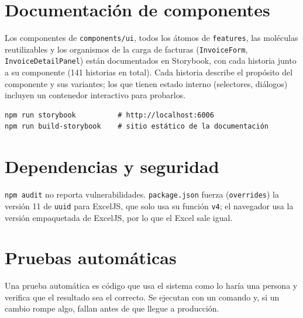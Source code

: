 \documentclass[11pt,letterpaper]{article}
\newcommand{\code}[1]{\nolinkurl{#1}}
\begin{document}
\section{Documentación de componentes}
Los componentes de \code{components/ui}, todos los átomos de \code{features}, las moléculas reutilizables y los organismos de la carga de facturas (\code{InvoiceForm}, \code{InvoiceDetailPanel}) están documentados en Storybook, con cada historia junto a su componente (141 historias en total). Cada historia describe el propósito del componente y sus variantes; los que tienen estado interno (selectores, diálogos) incluyen un contenedor interactivo para probarlos.

\begin{lstlisting}
npm run storybook          # http://localhost:6006
npm run build-storybook    # sitio estático de la documentación
\end{lstlisting}

\section{Dependencias y seguridad}
\code{npm audit} no reporta vulnerabilidades. \code{package.json} fuerza (\code{overrides}) la versión 11 de \code{uuid} para ExcelJS, que solo usa su función \code{v4}; el navegador usa la versión empaquetada de ExcelJS, por lo que el Excel sale igual.

\section{Pruebas automáticas}
Una prueba automática es código que usa el sistema como lo haría una persona y verifica que el resultado sea el correcto. Se ejecutan con un comando y, si un cambio rompe algo, fallan antes de que llegue a producción.
\end{document}
